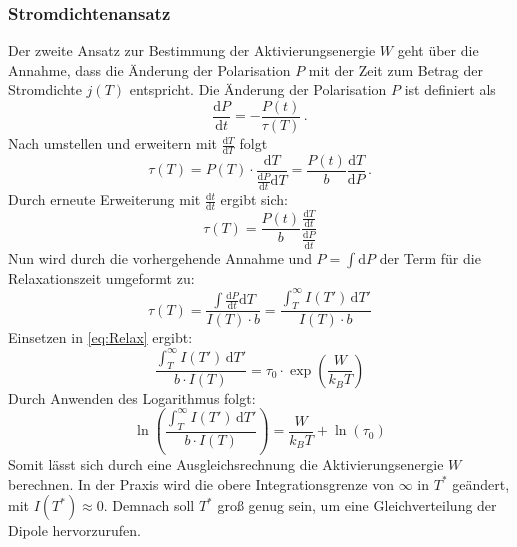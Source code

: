 \subsubsection{Stromdichtenansatz}
Der zweite Ansatz zur Bestimmung der Aktivierungsenergie $W$ geht über die Annahme,
dass die Änderung der Polarisation $P$ mit der Zeit zum Betrag der Stromdichte $j(T)$
entspricht.
Die Änderung der Polarisation $P$ ist definiert als
\begin{equation*}
    \frac{\text{d}P}{\text{d}t} = -\frac{P(t)}{\tau(T)}\, .
\end{equation*}
Nach umstellen und erweitern mit $\frac{\text{d}T}{\text{d}T}$ folgt 
\begin{equation*}
    \tau(T) = P(T) \cdot \frac{\text{d}T}{\frac{\text{d}P}{\text{d}t}\text{d}T } =  \frac{P(t)}{b} \frac{\text{d}T}{\text{d}P}\,.
\end{equation*}
Durch erneute Erweiterung mit $\frac{\text{d}t}{\text{d}t}$ ergibt sich:
\begin{equation*}
    \tau(T) = \frac{P(t)}{b} \frac{\frac{\text{d}T}{\text{d}t}}{\frac{\text{d}P}{\text{d}t}}
\end{equation*}
Nun wird durch die vorhergehende Annahme und $P =\int\text{d}P$ der Term für die Relaxationszeit umgeformt zu: 
\begin{equation*}
    \tau(T) = \frac{\int \frac{\text{d}P}{\text{d}t} \text{d}T}{I(T) \cdot b} = \frac{\int_T^\infty I(T') \, \text{d}T'}{I(T) \cdot b}
\end{equation*}
Einsetzen in \autoref{eq:Relax} ergibt:
\begin{equation}
    \frac{\int_T^\infty I(T') \, \text{d}T'}{b \cdot I(T)} = \tau_0 \cdot \exp \left(\frac{W}{k_B T}\right)
\end{equation}
Durch Anwenden des Logarithmus folgt:
\begin{equation}
    \ln\left(\frac{\int_T^\infty I(T') \, \text{d}T'}{b \cdot I(T)}\right) = \frac{W}{k_B T} + \ln(\tau_0)
    \label{eq:Int}
\end{equation}
Somit lässt sich durch eine Ausgleichsrechnung die Aktivierungsenergie $W$ berechnen. In der Praxis wird die obere Integrationsgrenze von $\infty$ in $T^*$ geändert, mit
$I\left(T^*\right)\approx 0$. Demnach soll $T^*$ groß genug sein, um eine Gleichverteilung der Dipole hervorzurufen. 